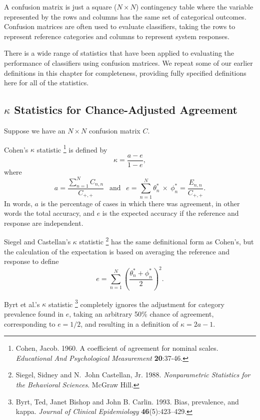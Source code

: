 A confusion matrix is just a square ($N \times N$) contingency table
where the variable represented by the rows and columns has the same
set of categorical outcomes.  Confusion matrices are often used to
evaluate classifiers, taking the rows to represent reference
categories and columns to represent system responses.

There is a wide range of statistics that have been applied to
evaluating the performance of classifiers using confusion matrices.
We repeat some of our earlier definitions in this chapter for
completeness, providing fully specified definitions here for all
of the statistics.

\subsection{$\kappa$ Statistics for Chance-Adjusted Agreement}\label{section:stats-kappa}

Suppose we have an $N \times N$ confusion matrix $C$.  

Cohen's $\kappa$ statistic%
\footnote{Cohen, Jacob. 1960. A coefficient of agreement for nominal
  scales. {\it Educational And Psychological Measurement} {\bf
    20}:37-46.}
%
is defined by
%
\begin{equation}
\kappa = \frac{a - e}{1 - e},
\end{equation}
%
where
%
\begin{equation}
a = \frac{\sum_{n=1}^N C_{n,n}}{C_{+,+}}
\ \ \mbox{ and } \ \ 
e = \sum_{n=1}^N \theta^*_n \ \times \ \phi^*_n = \frac{E_{n,n}}{C_{+,+}}.
\end{equation}
%
In words, $a$ is the percentage of cases in which there was agreement,
in other words the total accuracy, and $e$ is the expected accuracy if
the reference and response are independent.

Siegel and Castellan's $\kappa$ statistic%
\footnote{Siegel, Sidney and N.~John Castellan, Jr. 1988.  {\it
    Nonparametric Statistics for the Behavioral Sciences}. McGraw
  Hill.}
%
has the same definitional form as Cohen's, but the calculation of the
expectation is based on averaging the reference and response to define
%
\begin{equation}
e = \sum_{n=1}^N \left( \frac{\theta^*_n + \phi^*_n}{2} \right)^2.
\end{equation}

Byrt et al.'s $\kappa$ statistic%
%
\footnote{Byrt, Ted, Janet Bishop and John B. Carlin. 1993. Bias,
  prevalence, and kappa. {\it Journal of Clinical Epidemiology}
  {\bf 46}(5):423--429.}
%
completely ignores the adjustment for
category prevalence found in $e$, taking an arbitrary 50\% chance of
agreement, corresponding to $e=1/2$, and resulting in a definition of
$\kappa = 2a - 1$.



